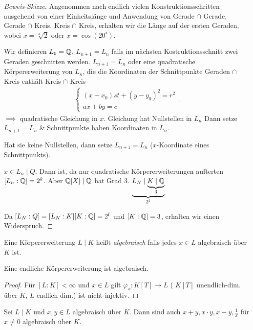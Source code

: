\begin{proof}[Beweis-Skizze]
	Angenommen nach endlich vielen Konstruktionsschritten ausgehend von einer Einheitslänge und Anwendung von
	Gerade $\cap$ Gerade, Gerade $\cap $ Kreis, Kreis $\cap $ Kreis, erhalten wir die Länge auf der ersten Geraden, wobei $x = \sqrt[3]{2}$ oder $x = \cos(20^{\circ})$.

	Wir definieren $L_0 = \mathbb{Q}$, $L_{n+1} = L_{n}$ falls im nächsten Kostruktionsschnitt zwei Geraden geschnitten werden.
	$L_{n+1} = L_{n}$ oder eine quadratische Körpererweiterung von $L_{n}$, die die Koordinaten der Schnittpunkte Geraden $\cap$ Kreis enthält Kreis $\cap$ Kreis
	\begin{align*}
		\begin{cases}
			(x-x_0)st + (y-y_0)^2 = r^2\\
			a x + b y = c
		\end{cases}
	.\end{align*}
	$\implies$ quadratische Gleichung in $x$. Gleichung hat Nullstellen in $L_{n}$ 
	Dann setze $L_{n+1} = L_{n}$ \& Schnittpunkte haben Koordinaten in $L_{n}$.

	Hat sie keine Nullstellen, dann setze $L_{n+1} = L_{n}$ ($x$-Koordinate eines Schnittpunkts).

	$x \in L_{n} \mid Q$. Dann ist, da nur quadratische Körpererweiterungen aufterten $[L_{n} : \mathbb{Q}] = 2^{k}$.
	Aber $\mathbb{Q}[X] \mid \mathbb{Q}$ hat Grad $3$. $\underbrace{L_{N} \mid \underbrace{K \mid \mathbb{Q}}_{3}}_{2^{l}}$

	Da $[L_{N} : Q] = [L_{N} : K] [K : \mathbb{Q}] = 2^{l}$ und $[K:\mathbb{Q}] = 3$, erhalten wir einen Widerspruch.
\end{proof}

\begin{definition}
	Eine Körpererweiterung $L \mid K$ heißt \emph{algebraisch} falls jedes $x \in L$ algebraisch über $K$ ist.
\end{definition}

\begin{lemma}
	Eine endliche Körpererweiterung ist algebraisch.
\end{lemma}

\begin{proof}
	Für $[L:K] < \infty$ und $x \in L$ gilt $\varphi_{x}: K[T] \to L$ ( $K[T]$ unendlich-dim. über $K$, $L$ endlich-dim.) ist nicht injektiv.
\end{proof}

\begin{corollary}
	Sei $L \mid K$ und $x,y \in L$ algebraisch über $K$. Dann sind auch $x+y, x\cdot y, x-y, \frac{1}{x}$ für $x\neq 0$ algebraisch über $K$.
\end{corollary}

